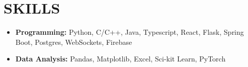 \section*{SKILLS}
\noindent
\begin{itemize}
	\item \textbf{Programming:} Python, C/C++, Java, Typescript, React, Flask, Spring Boot, Postgres, WebSockets, Firebase
	\item \textbf{Data Analysis:} Pandas, Matplotlib, Excel, Sci-kit Learn, PyTorch
\end{itemize}
